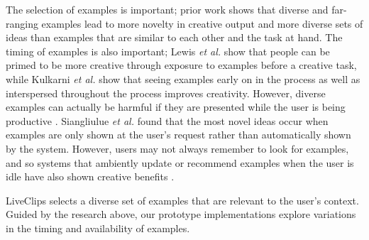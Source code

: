 The selection of examples is important; prior work shows that diverse and far-ranging examples lead to more novelty in creative output \cite{Chan2011} and more diverse sets of ideas \cite{Siangliulue2015a} than examples that are similar to each other and the task at hand. The timing of examples is also important; Lewis \textit{et al.} \cite{Lewis2011} show that people can be primed to be more creative through exposure to examples before a creative task, while Kulkarni \textit{et al.} \cite{Kulkarni2014} show that seeing examples early on in the process as well as interspersed throughout the process improves creativity. However, diverse examples can actually be harmful if they are presented while the user is being productive \cite{Chan2017}. Siangliulue \textit{et al.} \cite{Siangliulue2015} found that the most novel ideas occur when examples are only shown at the user's request rather than automatically shown by the system. However, users may not always remember to look for examples, and so systems that ambiently update or recommend examples when the user is idle have also shown creative benefits \cite{Siangliulue2015, Rhodes1996}.

LiveClips selects a diverse set of examples that are relevant to the user's context. Guided by the research above, our prototype implementations explore variations in the timing and availability of examples.


